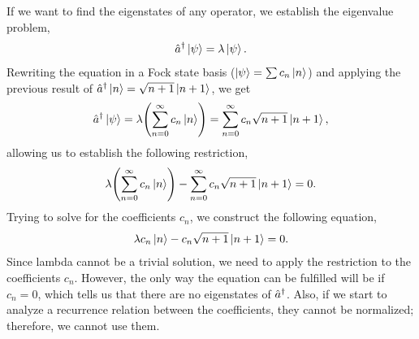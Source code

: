 \documentclass[../main.tex]{subfiles}
\begin{document}
If we want to find the eigenstates of any operator, we establish the eigenvalue problem, \[\hat{a}^\dagger\ket{\psi} = \lambda\ket{\psi}.\]
Rewriting the equation in a Fock state basis ($\ket{\psi}=\sum c_n\ket{n}$) and applying the previous result of $\hat{a}^\dagger\ket{n}=\sqrt{n+1}\ket{n+1}$, we get
\begin{gather*}
    \hat{a}^\dagger\ket{\psi} =\lambda\qty(\sum_{n=0}^\infty c_n\ket{n}) =\sum_{n=0}^\infty c_n\sqrt{n+1}\ket{n+1},
\end{gather*}
allowing us to establish the following restriction,
\begin{gather*}
    \lambda\qty(\sum_{n=0}^\infty c_n\ket{n}) - \sum_{n=0}^\infty c_n\sqrt{n+1}\ket{n+1} = 0.
\end{gather*}
Trying to solve for the coefficients $c_n$, we construct the following equation,
\begin{gather*}
    \lambda c_n\ket{n} - c_n\sqrt{n+1}\ket{n+1} = 0.
\end{gather*}
Since lambda cannot be a trivial solution, we need to apply the restriction to the coefficients $c_n$.
However, the only way the equation can be fulfilled will be if $c_n=0$, which tells us that there are no eigenstates of $\hat{a}^\dagger$.
Also, if we start to analyze a recurrence relation between the coefficients, they cannot be normalized; therefore, we cannot use them.



\end{document}
